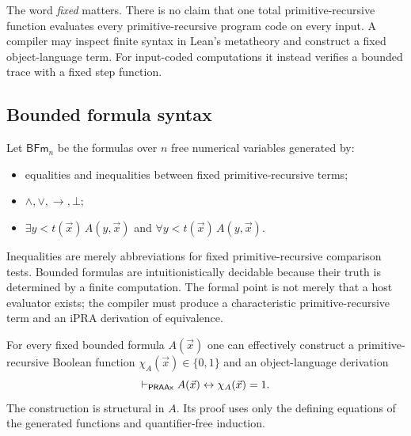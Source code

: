 The word \emph{fixed} matters.  There is no claim that one total primitive-recursive function evaluates every primitive-recursive program code on every input.  A compiler may inspect finite syntax in Lean's metatheory and construct a fixed object-language term.  For input-coded computations it instead verifies a bounded trace with a fixed step function.

\subsection{Bounded formula syntax}

Let \(\mathsf{BFm}_n\) be the formulas over \(n\) free numerical variables generated by:

\begin{itemize}
  \item equalities and inequalities between fixed primitive-recursive terms;
  \item \(\wedge,\vee,\to,\bot\);
  \item \(\exists y<t(\vec x)\,A(y,\vec x)\) and
        \(\forall y<t(\vec x)\,A(y,\vec x)\).
\end{itemize}

Inequalities are merely abbreviations for fixed primitive-recursive comparison tests.  Bounded formulas are intuitionistically decidable because their truth is determined by a finite computation.  The formal point is not merely that a host evaluator exists; the compiler must produce a characteristic primitive-recursive term and an iPRA derivation of equivalence.

\begin{theorem}\label{thm:booleanization}
For every fixed bounded formula \(A(\vec x)\) one can effectively construct a primitive-recursive Boolean function \(\chi_A(\vec x)\in\{0,1\}\) and an object-language derivation
\[
   \vdash_{\mathsf{PRAAx}}
   A(\vec x)\leftrightarrow \chi_A(\vec x)=1.
\]
The construction is structural in \(A\).  Its proof uses only the defining equations of the generated functions and quantifier-free induction.
\end{theorem}

